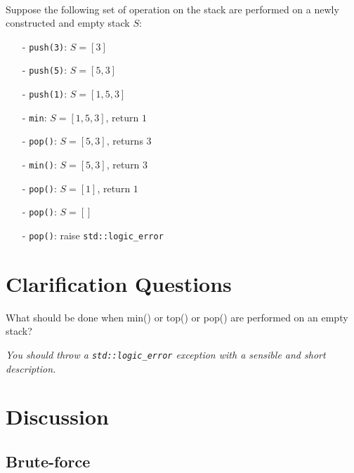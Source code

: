 \begin{exercise}
	\begin{example}
		\hfill \\
		Suppose the following set of operation on the stack are performed on a newly constructed and empty stack $S$:
		\begin{itemize}
			\item[-] \lstinline[columns=fixed]{push(3)}: $S=[3]$
			\item[-] \lstinline[columns=fixed]{push(5)}: $S=[5,3]$
			\item[-] \lstinline[columns=fixed]{push(1)}: $S=[1,5,3]$
			\item[-] \lstinline[columns=fixed]{min}: $S=[1,5,3]$, return $1$
			\item[-] \lstinline[columns=fixed]{pop()}: $S=[5,3]$, returns $3$
			\item[-] \lstinline[columns=fixed]{min()}: $S=[5,3]$, return $3$
			\item[-] \lstinline[columns=fixed]{pop()}: $S=[1]$, return $1$
			\item[-] \lstinline[columns=fixed]{pop()}: $S=[]$
			\item[-] \lstinline[columns=fixed]{pop()}: raise \lstinline[columns=fixed]{std::logic_error}
		\end{itemize}
		
	\end{example}
\end{exercise}

\section{Clarification Questions}

\begin{QandA}
	\item What should be done when min() or top() or pop() are performed on an empty stack?
	\begin{answered}
		\textit{You should throw a \lstinline[columns=fixed]{std::logic_error} exception with a sensible and short description.}
	\end{answered}
	
\end{QandA}

\section{Discussion}
\label{min_stack:sec:discussion}


\subsection{Brute-force}
\label{min_stack:sec:bruteforce}



